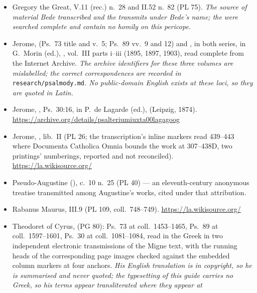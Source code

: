 \begin{itemize}[leftmargin=1.2em, itemsep=0.15em]
\textit{to the Gallican is likewise reported as its apparatus, no Roman-Psalter
witness having been collated for this guide.}
\item Gregory the Great,  V.11 (rec.) n.~28 and II.52
n.~82 (PL 75). \textit{The source of material Bede transcribed and the}
 \textit{transmits under Bede's name; the}
 \textit{were searched complete and contain no
homily on this pericope.}
\item Jerome,  (Ps.~73 title and v.~5; Ps.~89
vv.~9 and 12) and ,  in both series, in G.~Morin (ed.), ,
vol.~III parts i--iii (1895, 1897, 1903), read complete from the Internet
Archive. \textit{The archive identifiers for these three volumes are
mislabelled; the correct correspondences are recorded in}
\texttt{research/psalmody.md}\textit{. No public-domain English exists at these
loci, so they are quoted in Latin.}
\item Jerome, , Ps.~30:16, in P.~de Lagarde
(ed.),  (Leipzig, 1874).
\url{https://archive.org/details/psalteriumiuxta00lagagoog}
\item Jerome, , lib.\ II (PL 26; the
transcription's inline markers read 439--443 where Documenta Catholica Omnia
bounds the work at 307--438D, two printings' numberings, reported and not
reconciled). \url{https://la.wikisource.org/}
\item Pseudo-Augustine (),  c.~10 n.~25 (PL 40) --- an eleventh-century anonymous treatise
transmitted among Augustine's works, cited under that attribution.
\item Rabanus Maurus,  III.9 (PL 109,
coll.\ 748--749). \url{https://la.wikisource.org/}
\item Theodoret of Cyrus,  (PG 80): Ps.~73 at
coll.\ 1453--1465, Ps.~89 at coll.\ 1597--1601, Ps.~30 at coll.\ 1081--1084,
read in the Greek in two independent electronic transmissions of the Migne
text, with the running heads of the corresponding page images checked against
the embedded column markers at four anchors. \textit{His English translation is
in copyright, so he is summarised and never quoted; the typesetting of this
guide carries no Greek, so his terms appear transliterated where they appear at
}
\end{itemize}
